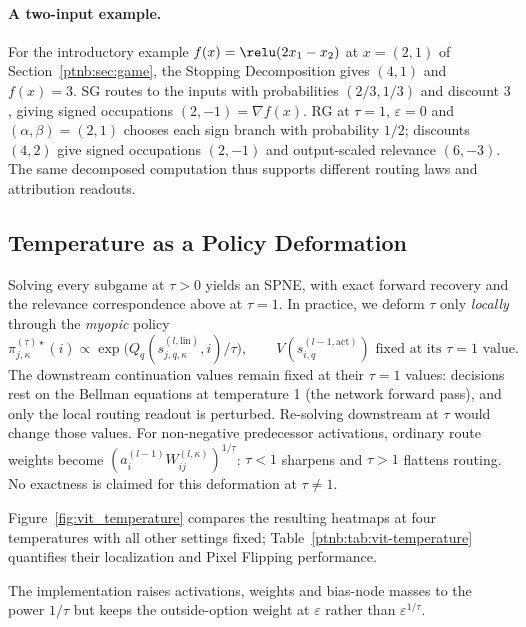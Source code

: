 \paragraph{A two-input example.}
For the introductory example $f(x)=\relu(2x_1-x_2)$ at $x=(2,1)$ of Section~\ref{ptnb:sec:game}, the Stopping Decomposition gives $(4,1)$ and $f(x)=3$. SG routes to the inputs with probabilities $(2/3,1/3)$ and discount $3$, giving signed occupations $(2,-1)=\nabla f(x)$. RG at $\tau=1$, $\varepsilon=0$ and $(\alpha,\beta)=(2,1)$ chooses each sign branch with probability $1/2$; discounts $(4,2)$ give signed occupations $(2,-1)$ and output-scaled relevance $(6,-3)$. The same decomposed computation thus supports different routing laws and attribution readouts.

\subsection{Temperature as a Policy Deformation}\label{ptnb:app:routing-temp}

Solving every subgame at $\tau>0$ yields an SPNE, with exact forward recovery and the relevance correspondence above at $\tau=1$. In practice, we deform $\tau$ only \emph{locally} through the \emph{myopic} policy
\begin{equation}\label{ptnb:eq:routing-gibbs-general-tau}
 \pi_{j,\kappa}^{(\tau)\star}(i)\propto
 \exp\!\bigl(Q_q(s_{j,q,\kappa}^{(l,\mathrm{lin})},i)/\tau\bigr),
 \qquad V(s_{i,q}^{(l-1,\mathrm{act})})\text{ fixed at its }\tau=1\text{ value}.
\end{equation}
The downstream continuation values remain fixed at their $\tau=1$ values: decisions rest on the Bellman equations at temperature 1 (the network forward pass), and only the local routing readout is perturbed. Re-solving downstream at $\tau$ would change those values. For non-negative predecessor activations, ordinary route weights become $(a_i^{(l-1)}W_{ij}^{(l,\kappa)})^{1/\tau}$: $\tau<1$ sharpens and $\tau>1$ flattens routing. No exactness is claimed for this deformation at $\tau\neq1$.
\begin{changed}Figure~\ref{fig:vit_temperature} compares the resulting heatmaps at four temperatures with all other settings fixed; Table~\ref{ptnb:tab:vit-temperature} quantifies their localization and Pixel Flipping performance.\end{changed}
The implementation raises activations, weights and bias-node masses to the power $1/\tau$ but keeps the outside-option weight at $\varepsilon$ rather than $\varepsilon^{1/\tau}$.

